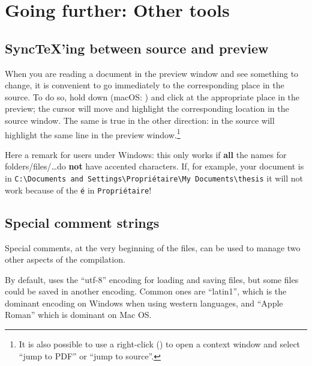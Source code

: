 
\chapter{Going further: Other tools}

\section{SyncTeX'ing between source and preview}
\label{sec.synctex}

When you are reading a document in the preview window and see something to change, it is convenient to go immediately to the corresponding place in the source. To do so, hold down  (macOS: ) and click at the appropriate place in the preview; the cursor will move and highlight the corresponding location in the source window. The same is true in the other direction:  in the source will highlight the same line in the preview window.\footnote{It is also possible to use a right-click () to open a context window and select ``jump to PDF'' or ``jump to source''.}

\begin{OSWindows}
Here a remark for users under Windows: this only works if \textbf{all} the names for folders/files/\dots do \textbf{not} have accented characters. If, for example, your document is in \texttt{C:{\textbackslash}Documents and Settings{\textbackslash}Propriétaire{\textbackslash}My Documents{\textbackslash}thesis} it will not work because of the \verb|é| in \texttt{Propriétaire}!
\end{OSWindows}

\section{Special comment strings}

Special comments, at the very beginning of the files, can be used to manage two other aspects of the compilation.

By default, {\Tw} uses the ``utf-8'' encoding for loading and saving files, but some files could be saved in another encoding. Common ones are ``latin1'', which is the dominant encoding on Windows when using western languages, and ``Apple Roman'' which is dominant on Mac OS.

